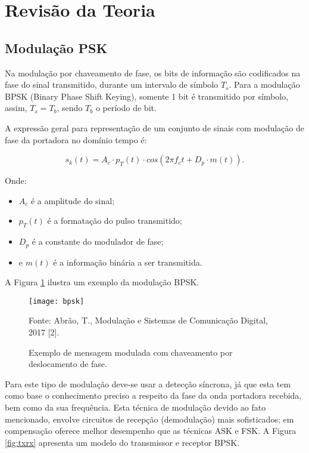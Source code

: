 \newpage
\section{Revisão da Teoria}

\subsection{Modulação PSK}

Na modulação por chaveamento de fase, os bits de informação são codificados na fase do sinal transmitido, durante um intervalo de símbolo $T_s$. Para a modulação BPSK (Binary Phase Shift Keying), somente 1 bit é transmitido por símbolo, assim, $T_s = T_b$, sendo $T_b$ o período de bit.

A expressão geral para representação de um conjunto de sinais com modulação de fase da portadora no domínio tempo é:

\begin{equation}
s_k(t) = A_c \cdot p_T(t) \cdot cos(2 \pi f_c t + D_p \cdot m(t)).
\end{equation}

Onde:

\begin{itemize}
	\item $A_c$ é a amplitude do sinal;
	
	\item $p_T(t)$ é a formatação do pulso transmitido;
	
	\item $D_p$ é a constante do modulador de fase;
	
	\item e $m(t)$ é a informação binária a ser transmitida.
\end{itemize}

A Figura \ref{fig:bpsk} ilustra um exemplo da modulação BPSK.


	\begin{figure}[H]
		\centering
		\caption{Exemplo de mensagem modulada com chaveamento por deslocamento de fase.}
		\texttt{[image: bpsk]}
		
		\small Fonte: Abrão, T., Modulação e Sistemas de Comunicação Digital, 2017 [2].
		\label{fig:bpsk}
	\end{figure}

Para este tipo de modulação deve-se usar a detecção síncrona, já que esta tem como base o conhecimento preciso a respeito da fase da onda portadora recebida, bem como da sua frequência. Esta técnica de modulação devido ao fato mencionado, envolve circuitos de recepção (demodulação) mais sofisticados; em compensação oferece melhor desempenho que as técnicas ASK e FSK. A Figura \ref{fig:txrx} apresenta um modelo do transmissor e receptor BPSK.

